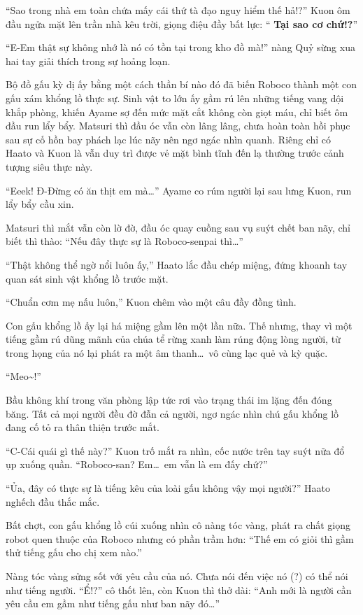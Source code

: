 \documentclass[../main.tex]{subfiles}
\begin{document}
``Sao trong nhà em toàn chứa mấy cái thứ tà đạo nguy hiểm thế hả!?'' Kuon ôm đầu ngửa mặt lên trần nhà kêu trời, giọng điệu đầy bất lực: ``\textbf{\color{blue} Tại sao cơ chứ!?}''

``E-Em thật sự không nhớ là nó có tồn tại trong kho đồ mà!'' nàng Quỷ sừng xua hai tay giải thích trong sự hoảng loạn.

Bộ đồ gấu kỳ dị ấy bằng một cách thần bí nào đó đã biến Roboco thành một con gấu xám khổng lồ thực sự. Sinh vật to lớn ấy gầm rú lên những tiếng vang dội khắp phòng, khiến Ayame sợ đến mức mặt cắt không còn giọt máu, chỉ biết ôm đầu run lẩy bẩy. Matsuri thì đầu óc vẫn còn lâng lâng, chưa hoàn toàn hồi phục sau sự cố hồn bay phách lạc lúc nãy nên ngơ ngác nhìn quanh. Riêng chỉ có Haato và Kuon là vẫn duy trì được vẻ mặt bình tĩnh đến lạ thường trước cảnh tượng siêu thực này.

``Eeek! Đ-Đừng có ăn thịt em mà\dots'' Ayame co rúm người lại sau lưng Kuon, run lẩy bẩy cầu xin.

Matsuri thì mắt vẫn còn lờ đờ, đầu óc quay cuồng sau vụ suýt chết ban nãy, chỉ biết thì thào: ``Nếu đây thực sự là Roboco-senpai thì\dots''

``Thật không thể ngờ nổi luôn ấy,'' Haato lắc đầu chép miệng, đứng khoanh tay quan sát sinh vật khổng lồ trước mặt.

``Chuẩn cơm mẹ nấu luôn,'' Kuon chêm vào một câu đầy đồng tình.

Con gấu khổng lồ ấy lại há miệng gầm lên một lần nữa. Thế nhưng, thay vì một tiếng gầm rú dũng mãnh của chúa tể rừng xanh làm rúng động lòng người, từ trong họng của nó lại phát ra một âm thanh\dots\ vô cùng lạc quẻ và kỳ quặc.

``Meo\~{}!''

Bầu không khí trong văn phòng lập tức rơi vào trạng thái im lặng đến đóng băng. Tất cả mọi người đều đờ đẫn cả người, ngơ ngác nhìn chú gấu khổng lồ đang cố tỏ ra thân thiện trước mắt.

``C-Cái quái gì thế này?'' Kuon trố mắt ra nhìn, cốc nước trên tay suýt nữa đổ ụp xuống quần. ``Roboco-san? Em\dots\ em vẫn là em đấy chứ?''

``Ủa, đây có thực sự là tiếng kêu của loài gấu không vậy mọi người?'' Haato nghếch đầu thắc mắc.

Bất chợt, con gấu khổng lồ cúi xuống nhìn cô nàng tóc vàng, phát ra chất giọng robot quen thuộc của Roboco nhưng có phần trầm hơn: ``Thế em có giỏi thì gầm thử tiếng gấu cho chị xem nào.''

Nàng tóc vàng sửng sốt với yêu cầu của nó. Chưa nói đến việc nó (?) có thể nói như tiếng người. ``Ể!?'' cô thốt lên, còn Kuon thì thở dài: ``Anh mới là người cần yêu cầu em gầm như tiếng gấu như ban nãy đó\dots''
\end{document}

